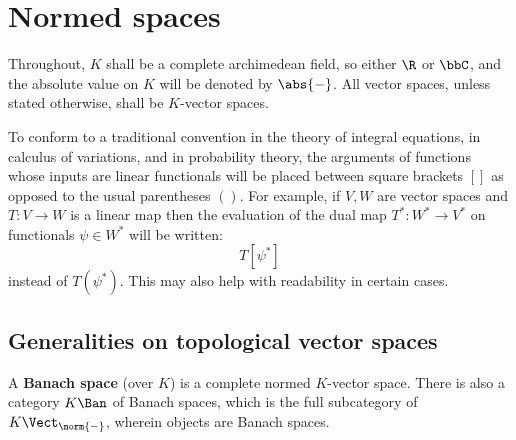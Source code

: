 \section{Normed spaces}
    Throughout, $K$ shall be a complete archimedean field, so either $\R$ or $\bbC$, and the absolute value on $K$ will be denoted by $\abs{-}$. All vector spaces, unless stated otherwise, shall be $K$-vector spaces.

    \begin{convention}
        To conform to a traditional convention in the theory of integral equations, in calculus of variations, and in probability theory, the arguments of functions whose inputs are linear functionals will be placed between square brackets $[]$ as opposed to the usual parentheses $()$. For example, if $V, W$ are vector spaces and $T: V \to W$ is a linear map then the evaluation of the dual map $T^*: W^* \to V^*$ on functionals $\psi \in W^*$ will be written:
            $$T[\psi^*]$$
        instead of $T(\psi^*)$. This may also help with readability in certain cases. 
    \end{convention}
 
    \subsection{Generalities on topological vector spaces}
        \begin{definition} \label{def: banach_spaces}
            A \textbf{Banach space} (over $K$) is a complete normed $K$-vector space. There is also a category $K\-\Ban$ of Banach spaces, which is the full subcategory of $K\-\Vect_{\norm{-}}$, wherein objects are Banach spaces.
        \end{definition}
    
